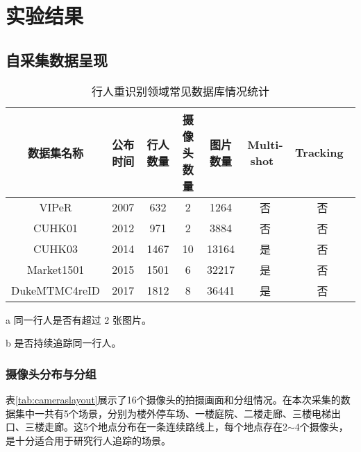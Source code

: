 \chapter{实验结果}\label{sec:experiment}

\section{自采集数据呈现}

\begin{table}[!htb]
\centering
\caption{行人重识别领域常见数据库情况统计}
\label{tab:reiddataset}
\begin{threeparttable}
\begin{tabularx}{\textwidth}{ccccccc}
\toprule
数据集名称   & 公布时间 & 行人数量 & 摄像头数量 & 图片数量  & Multi-shot~\tnote{a} & Tracking~\tnote{b} \\ \midrule
VIPeR         & 2007 & 632  & 2     & 1264  & 否          & 否                  \\
CUHK01        & 2012 & 971  & 2     & 3884  & 否          & 否                  \\
CUHK03        & 2014 & 1467 & 10    & 13164 & 是          & 否                  \\
Market1501    & 2015 & 1501 & 6     & 32217 & 是          & 否                  \\
DukeMTMC4reID & 2017 & 1812 & 8     & 36441 & 是          & 否                  \\ \bottomrule
\end{tabularx}
\begin{tablenotes}
    \footnotesize
    \item[a] 同一行人是否有超过 2 张图片。
    \item[b] 是否持续追踪同一行人。
\end{tablenotes}
\end{threeparttable}
\end{table}

\subsection{摄像头分布与分组}

表\ref{tab:cameraslayout}展示了16个摄像头的拍摄画面和分组情况。在本次采集的数据集中一共有5个场景，分别为楼外停车场、一楼庭院、二楼走廊、三楼电梯出口、三楼走廊。这5个地点分布在一条连续路线上，每个地点存在2$\sim$4个摄像头，是十分适合用于研究行人追踪的场景。

